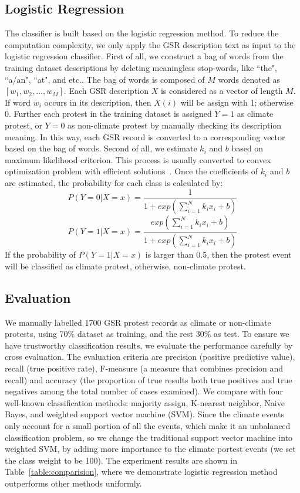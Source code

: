 \subsection{Logistic Regression}
The classifier is built based on the logistic regression method.
To reduce the computation complexity, we only apply the GSR description text as input to the logistic regression classifier. First of all, we construct a bag of words from the training dataset descriptions by deleting meaningless stop-words, like ``the", ``a/an", ``at", and etc.. The bag of words is composed of $M$ words denoted as $[w_1, w_2, ..., w_M]$.
Each GSR description $X$ is considered as a vector of length $M$. If word $w_i$ occurs in its description, then $X(i)$ will be assign with 1; otherwise 0. Further each protest in the training dataset is assigned $Y=1$ as climate protest, or $Y=0$ as non-climate protest by manually checking its description meaning. In this way, each GSR record is converted to a corresponding vector based on the bag of words. Second of all, we estimate $k_i$ and $b$ based on maximum likelihood criterion. This process is usually converted to convex optimization problem with efficient solutions~\cite{james2013introduction}. Once the coefficients of $k_i$ and $b$ are estimated, the probability for each class is calculated by:
$$P(Y = 0| X=x)= \frac{1}{1+exp( {\sum_{i=1}^{N} k_ix_i}+b)}$$
$$P(Y = 1| X=x)= \frac{exp( {\sum_{i=1}^{N} k_ix_i}+b)}{1+exp( {\sum_{i=1}^{N} k_ix_i}+b)}$$
If the probability of $P(Y = 1| X=x)$ is larger than 0.5, then the protest event will be classified as climate protest, otherwise, non-climate protest.


\subsection{Evaluation}
We manually labelled 1700 GSR protest records as climate or non-climate 
protests, using 70\% dataset as training, and the rest 30\% as test. To ensure we have trustworthy classification results, we evaluate the performance carefully by cross evaluation. The evaluation criteria are precision (positive predictive value), recall (true positive rate), F-measure (a measure that combines precision and recall) and accuracy (the proportion of true results both true positives and true negatives among the total number of cases examined). We compare with four well-known classification methods: majority assign, K-nearest neighbor, Naive Bayes, and weighted support vector machine (SVM). Since the climate events only account for a small portion of all the events, which make it an unbalanced classification problem, so we change the traditional support vector machine into weighted SVM, by adding more importance to the climate portest events (we set the class weight to be 100). The experiment results are shown in Table~\ref{table:comparision}, where we demonstrate logistic regression method outperforms other methods uniformly.

